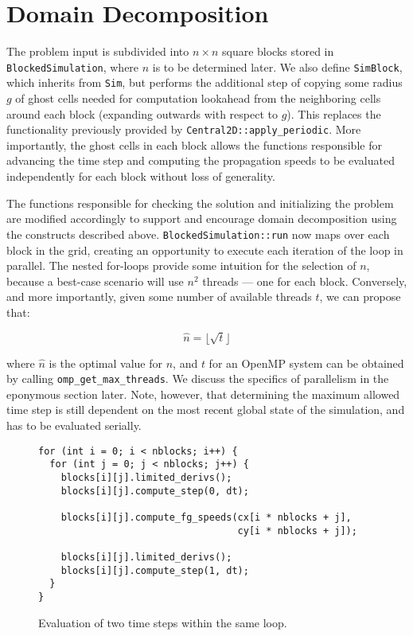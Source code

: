 \documentclass{scrartcl}
\begin{document}
  \section{Domain Decomposition}
  The problem input is subdivided into $n \times n$ square blocks stored in \texttt{BlockedSimulation}, where $n$ is to be determined later. We also define \texttt{SimBlock}, which inherits from \texttt{Sim}, but performs the additional step of copying some radius $g$ of ghost cells needed for computation lookahead from the neighboring cells around each block (expanding outwards with respect to $g$). This replaces the functionality previously provided by \texttt{Central2D::apply\_periodic}. More importantly, the ghost cells in each block allows the functions responsible for advancing the time step and computing the propagation speeds to be evaluated independently for each block without loss of generality.

  The functions responsible for checking the solution and initializing the problem are modified accordingly to support and encourage domain decomposition using the constructs described above. \texttt{BlockedSimulation::run} now maps over each block in the grid, creating an opportunity to execute each iteration of the loop in parallel. The nested for-loops provide some intuition for the selection of $n$, because a best-case scenario will use $n^2$ threads --- one for each block. Conversely, and more importantly, given some number of available threads $t$, we can propose that:

  \[
    \hat{n} = \lfloor\sqrt{t}\rfloor
  \]

  where $\hat{n}$ is the optimal value for $n$, and $t$ for an OpenMP system can be obtained by calling \texttt{omp\_get\_max\_threads}. We discuss the specifics of parallelism in the eponymous section later. Note, however, that determining the maximum allowed time step is still dependent on the most recent global state of the simulation, and has to be evaluated serially.

  \begin{figure}[ht!]
    \begin{lstlisting}
for (int i = 0; i < nblocks; i++) {
  for (int j = 0; j < nblocks; j++) {
    blocks[i][j].limited_derivs();
    blocks[i][j].compute_step(0, dt);

    blocks[i][j].compute_fg_speeds(cx[i * nblocks + j],
                                   cy[i * nblocks + j]);

    blocks[i][j].limited_derivs();
    blocks[i][j].compute_step(1, dt);
  }
}
    \end{lstlisting}
    \caption{Evaluation of two time steps within the same loop.\label{alg:twostep}}
  \end{figure}
\end{document}
